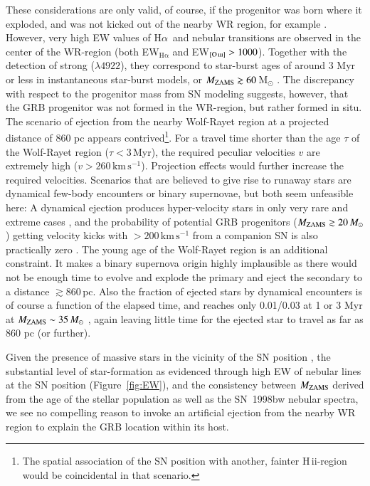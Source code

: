 \documentclass[traditabstract]{aa}
\newcommand{\ha}{H$\alpha$}
\newcommand{\hii}{\mbox{H\,{\sc ii}}}
\newcommand{\hei}{\ion{He}{i}}
\newcommand{\oiii}{[\ion{O}{iii}]}
\begin{document}
These considerations are only valid, of course, if the progenitor was born where it exploded, and was not kicked out of the nearby WR region, for example \citep{2006A&A...454..103H}. However, very high EW values of \ha~and nebular transitions are observed in the center of the WR-region (both EW$_{\mathrm{H\alpha}}$ and EW$_{\oiii}>1000$). Together with the detection of strong \hei($\lambda4922$), they correspond to star-burst ages of around 3 Myr or less in instantaneous star-burst models, or $M_{\rm{ZAMS}} \gtrsim 60$\,M$_{\odot}$ \citep[see e.g.,][and references therein]{2015MNRAS.451L..65T}. The discrepancy with respect to the progenitor mass from SN modeling suggests, however, that the GRB progenitor was not formed in the WR-region, but rather formed in situ. The scenario of ejection from the nearby Wolf-Rayet region at a projected distance of 860 pc \citep{2006A&A...454..103H} appears contrived\footnote{The spatial association of the SN position with another, fainter \hii-region would be coincidental in that scenario.}. For a travel time shorter than the age $\tau$ of the Wolf-Rayet region ($\tau<3$\,Myr), the required peculiar velocities $v$ are extremely high ($v>260\,\mathrm{km\,s^{-1}}$). Projection effects would further increase the required velocities. Scenarios that are believed to give rise to runaway stars are dynamical few-body encounters or binary supernovae, but both seem unfeasible here: A dynamical ejection produces hyper-velocity stars in only very rare and extreme cases \citep{2001A&A...365...49H, 2012ApJ...751..133P}, and the probability of potential GRB progenitors ($M_{\rm{ZAMS}}\gtrsim 20\,M_\odot$) getting velocity kicks with $>200\,\mathrm{km\,s^{-1}}$ from a companion SN is also practically zero \citep{2011MNRAS.414.3501E}. The young age of the Wolf-Rayet region is an additional constraint. It makes a binary supernova origin highly implausible as there would not be enough time to evolve and explode the primary and eject the secondary to a distance $\gtrsim860$\,pc. Also the fraction of ejected stars by dynamical encounters is of course a function of the elapsed time, and reaches only 0.01/0.03 at 1 or 3 Myr at $M_{\rm{ZAMS}}\sim 35\,M_\odot$ \citep{2012ApJ...746...15B}, again leaving little time for the ejected star to travel as far as 860 pc (or further).

Given the presence of massive stars in the vicinity of the SN position \citep{2000ApJ...542L..89F}, the substantial level of star-formation as evidenced through high EW of nebular lines at the SN position (Figure~\ref{fig:EW}), and the consistency between $M_{\rm{ZAMS}}$ derived from the age of the stellar population as well as the SN~1998bw nebular spectra, we see no compelling reason to invoke an artificial ejection from the nearby WR region to explain the GRB location within its host.
\end{document}
